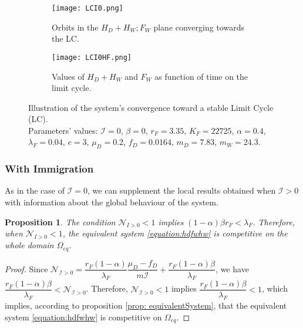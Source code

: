 \documentclass{article}
\newcommand{\lfw}{\lambda_{F}}
\newcommand{\lfw}{\lambda_{F}}
\newcommand{\cI}{\mathcal{I}}
\newtheorem{prop}[theorem]{Proposition}
\theoremstyle{definition}
\theoremstyle{remark}
\begin{document}
\begin{figure}[!ht]
\begin{subfigure}{0.45\textwidth}
\centering
\texttt{[image: LCI0.png]}
\caption{\centering Orbits in the $H_D + H_W ; F_W$ plane converging towards the LC.}
\label{fig:LCI0, 1}
\end{subfigure}
\begin{subfigure}{0.45\textwidth}
\centering
\texttt{[image: LCI0HF.png]}
\caption{\centering Values of $H_D + H_W$ and $F_W$ as function of time on the limit cycle.}
\label{fig:LCI0, 2}
\end{subfigure}
\caption{Illustration of the system's convergence toward a stable Limit Cycle (LC). \\
Parameters' values: $\cI = 0$, $\beta = 0$, $r_F = 3.35$, $K_F = 22725$, $\alpha = 0.4$, $\lfw = 0.04$, $e = 3$, $\mu_D = 0.2$, $f_D = 0.0164$, $m_D = 7.83$, $m_W = 24.3$.}
\end{figure}


\subsubsection{With Immigration}

As in the case of $\cI = 0$, we can supplement the local results obtained when $\cI > 0$ with information about the global behaviour of the system. 

\begin{prop}
The condition $\mathcal{N}_{I > 0} < 1$ implies $(1-\alpha) \beta r_F < \lfw$. Therefore, when $\mathcal{N}_{I > 0} < 1$, the equivalent system \eqref{equation:hdfwhw} is competitive on the whole domain $\Omega_{eq}$.
\end{prop}

\begin{proof}
Since $\mathcal{N}_{\cI > 0} = \dfrac{r_F(1-\alpha)}{\lfw}\dfrac{\mu_D - f_D}{m \cI} + \dfrac{r_F(1-\alpha) \beta}{\lfw}$, we have $\dfrac{r_F(1-\alpha) \beta}{\lfw} < \mathcal{N}_{\cI > 0}$. Therefore, $\mathcal{N}_{\cI > 0} < 1$ implies $\dfrac{r_F(1-\alpha) \beta}{\lfw} < 1$, which implies, according to proposition \ref{prop: equivalentSystem}, that the equivalent system \eqref{equation:hdfwhw} is competitive on $\Omega_{eq}$.
\end{proof}
\end{document}
